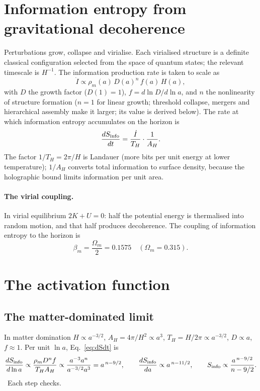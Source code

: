 \section{Information entropy from gravitational decoherence}
Perturbations grow, collapse and virialise. Each virialised structure is a definite classical configuration selected from the space of quantum states;
the relevant timescale is $H^{-1}$. The information production rate is taken to scale as
\begin{equation}\dot I\propto\rho_m(a)\,D(a)^n\,f(a)\,H(a),\label{eq:Idot}\end{equation}
with $D$ the growth factor ($D(1)=1$), $f=d\ln D/d\ln a$, and $n$ the nonlinearity of structure formation ($n=1$ for linear growth; threshold collapse,
mergers and hierarchical assembly make it larger; its value is derived below). The rate at which
information entropy accumulates on the horizon is
\begin{equation}\frac{dS_{\rm info}}{dt}=\frac{\dot I}{T_H}\cdot\frac{1}{A_H}.\label{eq:dSdt}\end{equation}
The factor $1/T_H=2\pi/H$ is Landauer (more bits per unit energy at lower temperature); $1/A_H$ converts total information to surface density, because the
holographic bound limits information per unit area.

\paragraph{The virial coupling.} In virial equilibrium $2K+U=0$: half the potential energy is thermalised into random motion, and that half produces
decoherence. The coupling of information entropy to the horizon is
\begin{equation}\beta_m=\frac{\Omega_m}{2}=0.1575\quad(\Omega_m=0.315).\end{equation}

\section{The activation function}
\subsection{The matter-dominated limit}
In matter domination $H\propto a^{-3/2}$, $A_H=4\pi/H^2\propto a^3$, $T_H=H/2\pi\propto a^{-3/2}$, $D\propto a$, $f\approx1$. Per unit $\ln a$, Eq.~\eqref{eq:dSdt} is
\begin{equation}\frac{dS_{\rm info}}{d\ln a}\propto\frac{\rho_mD^nf}{T_HA_H}\propto\frac{a^{-3}a^n}{a^{-3/2}a^{3}}=a^{\,n-9/2},\qquad
\frac{dS_{\rm info}}{da}\propto a^{\,n-11/2},\qquad S_{\rm info}\propto\frac{a^{\,n-9/2}}{n-9/2}.\label{eq:Sn}\end{equation}
\calc\ Each step checks.

